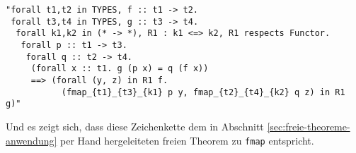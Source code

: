 \begin{verbatim}
"forall t1,t2 in TYPES, f :: t1 -> t2.
 forall t3,t4 in TYPES, g :: t3 -> t4.
  forall k1,k2 in (* -> *), R1 : k1 <=> k2, R1 respects Functor.
   forall p :: t1 -> t3.
    forall q :: t2 -> t4.
     (forall x :: t1. g (p x) = q (f x))
     ==> (forall (y, z) in R1 f.
           (fmap_{t1}_{t3}_{k1} p y, fmap_{t2}_{t4}_{k2} q z) in R1 g)"
\end{verbatim}

Und es zeigt sich, dass diese Zeichenkette dem in Abschnitt \ref{sec:freie-theoreme-anwendung} per Hand hergeleiteten
freien Theorem zu \texttt{fmap} entspricht.
